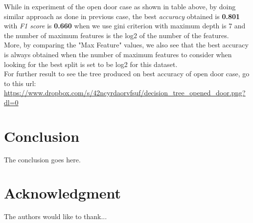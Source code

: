 \documentclass[conference]{IEEEtran}
\begin{document}
While in experiment of the open door case as shown in table above, by doing similar approach as done in previous case, the best \textit{accuracy} obtained is \textbf{0.801} with \textit{F1 score} is \textbf{0.660} when we use gini criterion with maximum depth is 7 and the number of maximum features is the log2 of the number of the features.\\

More, by comparing the "Max Feature" values, we also see that the best accuracy is always obtained when the number of maximum features to consider when looking for the best split is set to be log2 for this dataset. \\

For further result to see the tree produced on best accuracy of open door case, go to this url: \url{https://www.dropbox.com/s/42ncyrdaorvfsuf/decision_tree_opened_door.png?dl=0}

\vspace{2cm}
\section{Conclusion}
The conclusion goes here.






\section*{Acknowledgment}


The authors would like to thank...
\end{document}
